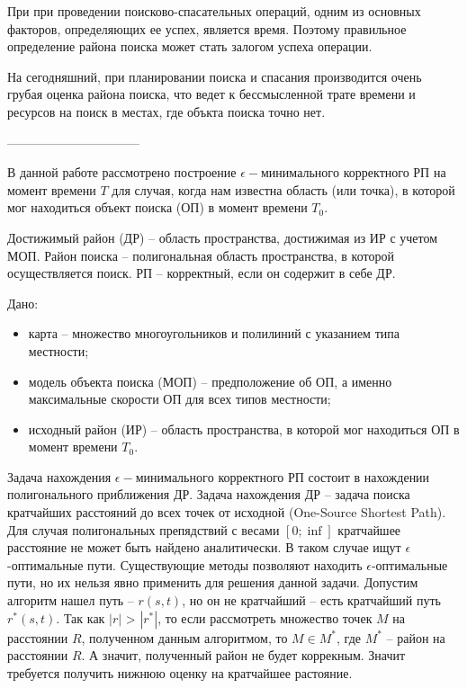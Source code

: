 \startprefacepage

При при проведении поисково-спасательных операций, одним
из основных факторов, определяющих ее успех, является время.
Поэтому правильное определение района поиска может стать залогом
успеха операции.

На сегодняшний, при планировании поиска и спасания производится
очень грубая оценка района поиска, что ведет к бессмысленной трате
времени и ресурсов на поиск в местах, где объкта поиска точно нет.

--------------------------------

В данной работе рассмотрено построение $\epsilon-минимального$ корректного РП
на момент времени $T$ для случая, когда нам известна область (или точка),
в которой мог находиться объект поиска (ОП) в момент времени $T_0$.

Достижимый район (ДР) -- область пространства, достижимая из ИР с учетом МОП.
Район поиска -- полигональная область пространства, в которой осуществляется поиск.
РП -- корректный, если он содержит в себе ДР.

Дано:
\begin{itemize}
\item карта -- множество многоугольников и полилиний с указанием типа местности;
\item модель объекта поиска (МОП) -- предположение об ОП, а именно максимальные скорости
ОП для всех типов местности;
\item исходный район (ИР) -- область пространства, в которой мог находиться ОП
в момент времени $T_0$.
\end{itemize}

Задача нахождения $\epsilon-минимального$ корректного РП состоит в нахождении
полигонального приближения ДР.
Задача нахождения ДР -- задача поиска кратчайших расстояний до всех точек от
исходной (One-Source Shortest Path).
Для случая полигональных препядствий с весами $[0; \inf]$ кратчайшее расстояние
не может быть найдено аналитически. В таком случае ищут $\epsilon$-оптимальные пути.
Существующие методы позволяют находить $\epsilon$-оптимальные пути, но их нельзя
явно применить для решения данной задачи. Допустим алгоритм нашел путь -- $r(s, t)$,
но он не кратчайший -- есть кратчайший путь $r^*(s, t)$. Так как $|r|$ > $|r^*|$, то
если рассмотреть множество точек $M$ на расстоянии $R$, полученном данным алгоритмом,
то $M \in M^*$, где $M^*$ -- район на расстоянии $R$. А значит, полученный район не
будет коррекным. Значит требуется получить нижнюю оценку на кратчайшее растояние.
